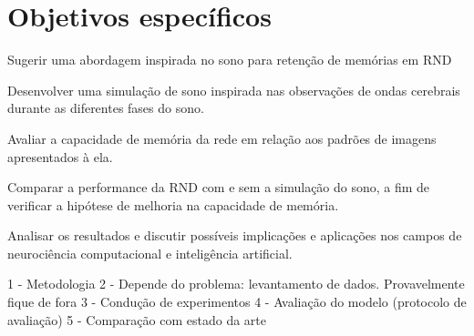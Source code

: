\section{Objetivos específicos}

Sugerir uma abordagem inspirada no sono para retenção de memórias em RND

Desenvolver uma simulação de sono inspirada nas observações de ondas cerebrais durante as diferentes fases do sono.

Avaliar a capacidade de memória da rede em relação aos padrões de imagens apresentados à ela.

Comparar a performance da RND com e sem a simulação do sono, a fim de verificar a hipótese de melhoria na capacidade de memória.

Analisar os resultados e discutir possíveis implicações e aplicações nos campos de neurociência computacional e inteligência
artificial.



1 - Metodologia
2 - Depende do problema: levantamento de dados. Provavelmente fique de fora
3 - Condução de experimentos
4 - Avaliação do modelo (protocolo de avaliação)
5 - Comparação com estado da arte
